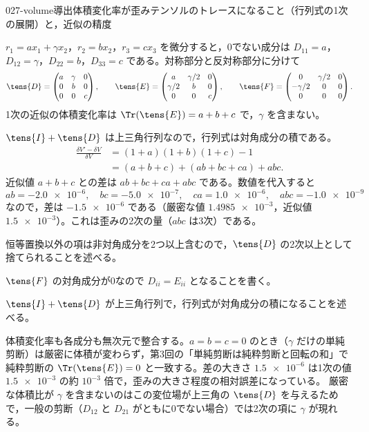 \documentclass[uplatex,dvipdfmx,a4paper,11pt]{jsarticle}
\begin{document}
\begin{mondai}{027-volume}{導出}{体積変化率が歪みテンソルのトレースになること（行列式の1次の展開）と，近似の精度}
\begin{tadashii}
 $r_1=ax_1+\gamma x_2$，$r_2=bx_2$，$r_3=cx_3$ を微分すると，0でない成分は $D_{11}=a$，$D_{12}=\gamma$，$D_{22}=b$，$D_{33}=c$ である。対称部分と反対称部分に分けて
\[ \tens{D}=\begin{pmatrix}a&\gamma&0\\0&b&0\\0&0&c\end{pmatrix},\qquad \tens{E}=\begin{pmatrix}a&\gamma/2&0\\\gamma/2&b&0\\0&0&c\end{pmatrix},\qquad \tens{F}=\begin{pmatrix}0&\gamma/2&0\\-\gamma/2&0&0\\0&0&0\end{pmatrix}. \]
1次の近似の体積変化率は $\Tr(\tens{E})=a+b+c$ で，$\gamma$ を含まない。

 $\tens{I}+\tens{D}$ は上三角行列なので，行列式は対角成分の積である。
\begin{align*}
\frac{\delta V'-\delta V}{\delta V}&=(1+a)(1+b)(1+c)-1\\
&=(a+b+c)+(ab+bc+ca)+abc.
\end{align*}
近似値 $a+b+c$ との差は $ab+bc+ca+abc$ である。数値を代入すると
\[ ab=\num{-2.0e-6},\quad bc=\num{-5.0e-7},\quad ca=\num{1.0e-6},\quad abc=\num{-1.0e-9} \]
なので，差は $\num{-1.5e-6}$ である（厳密な値 $\num{1.4985e-3}$，近似値 $\num{1.5e-3}$）。これは歪みの2次の量（$abc$ は3次）である。
\begin{ronten}
  \item {} 恒等置換以外の項は非対角成分を2つ以上含むので，$\tens{D}$ の2次以上として捨てられることを述べる。
  \item {} $\tens{F}$ の対角成分が0なので $D_{ii}=E_{ii}$ となることを書く。
  \item {} $\tens{I}+\tens{D}$ が上三角行列で，行列式が対角成分の積になることを述べる。
\end{ronten}
\kenzan 体積変化率も各成分も無次元で整合する。$a=b=c=0$ のとき（$\gamma$ だけの単純剪断）は厳密に体積が変わらず，第3回の「単純剪断は純粋剪断と回転の和」で純粋剪断の $\Tr(\tens{E})=0$ と一致する。差の大きさ $\num{1.5e-6}$ は1次の値 $\num{1.5e-3}$ の約 $10^{-3}$ 倍で，歪みの大きさ程度の相対誤差になっている。
\tsumazuki 厳密な体積比が $\gamma$ を含まないのはこの変位場が上三角の $\tens{D}$ を与えるためで，一般の剪断（$D_{12}$ と $D_{21}$ がともに0でない場合）では2次の項に $\gamma$ が現れる。
\end{tadashii}
\end{mondai}
\end{document}
